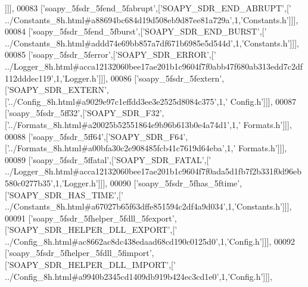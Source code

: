 \begin{DoxyCode}
      ]]],
00083   [\textcolor{stringliteral}{'soapy\_5fsdr\_5fend\_5fabrupt'},[\textcolor{stringliteral}{'SOAPY\_SDR\_END\_ABRUPT'},[\textcolor{stringliteral}{'
      ../Constants\_8h.html#a88694bc684d19d508eb9d87ee81a729a'},1,\textcolor{stringliteral}{'Constants.h'}]]],
00084   [\textcolor{stringliteral}{'soapy\_5fsdr\_5fend\_5fburst'},[\textcolor{stringliteral}{'SOAPY\_SDR\_END\_BURST'},[\textcolor{stringliteral}{'
      ../Constants\_8h.html#addd74e69bb857a7df671b6985e5d544d'},1,\textcolor{stringliteral}{'Constants.h'}]]],
00085   [\textcolor{stringliteral}{'soapy\_5fsdr\_5ferror'},[\textcolor{stringliteral}{'SOAPY\_SDR\_ERROR'},[\textcolor{stringliteral}{'
      ../Logger\_8h.html#acca12132060bee17ae201b1c9604f7f0abb47f680ab313edd7c2df112dddec119'},1,\textcolor{stringliteral}{'Logger.h'}]]],
00086   [\textcolor{stringliteral}{'soapy\_5fsdr\_5fextern'},[\textcolor{stringliteral}{'SOAPY\_SDR\_EXTERN'},[\textcolor{stringliteral}{'../Config\_8h.html#a9029e97c1effdd3ee3e2525d8084c375'},1,\textcolor{stringliteral}{'
      Config.h'}]]],
00087   [\textcolor{stringliteral}{'soapy\_5fsdr\_5ff32'},[\textcolor{stringliteral}{'SOAPY\_SDR\_F32'},[\textcolor{stringliteral}{'../Formats\_8h.html#a20025b52551864e9b96b613b0e4a74d1'},1,\textcolor{stringliteral}{'
      Formats.h'}]]],
00088   [\textcolor{stringliteral}{'soapy\_5fsdr\_5ff64'},[\textcolor{stringliteral}{'SOAPY\_SDR\_F64'},[\textcolor{stringliteral}{'../Formats\_8h.html#a00bfa30c2e908485fcb41c7619d64eba'},1,\textcolor{stringliteral}{'
      Formats.h'}]]],
00089   [\textcolor{stringliteral}{'soapy\_5fsdr\_5ffatal'},[\textcolor{stringliteral}{'SOAPY\_SDR\_FATAL'},[\textcolor{stringliteral}{'
      ../Logger\_8h.html#acca12132060bee17ae201b1c9604f7f0ada5d1fb7f2b331f0d96eb580c0277b35'},1,\textcolor{stringliteral}{'Logger.h'}]]],
00090   [\textcolor{stringliteral}{'soapy\_5fsdr\_5fhas\_5ftime'},[\textcolor{stringliteral}{'SOAPY\_SDR\_HAS\_TIME'},[\textcolor{stringliteral}{'
      ../Constants\_8h.html#a67027b65f63dffe851594c2df4a9d034'},1,\textcolor{stringliteral}{'Constants.h'}]]],
00091   [\textcolor{stringliteral}{'soapy\_5fsdr\_5fhelper\_5fdll\_5fexport'},[\textcolor{stringliteral}{'SOAPY\_SDR\_HELPER\_DLL\_EXPORT'},[\textcolor{stringliteral}{'
      ../Config\_8h.html#ac8662ac8dc438edaad68cd190c0125d0'},1,\textcolor{stringliteral}{'Config.h'}]]],
00092   [\textcolor{stringliteral}{'soapy\_5fsdr\_5fhelper\_5fdll\_5fimport'},[\textcolor{stringliteral}{'SOAPY\_SDR\_HELPER\_DLL\_IMPORT'},[\textcolor{stringliteral}{'
      ../Config\_8h.html#a9940b2345cd1409db919b424ec3cd1e0'},1,\textcolor{stringliteral}{'Config.h'}]]],

\end{DoxyCode}
